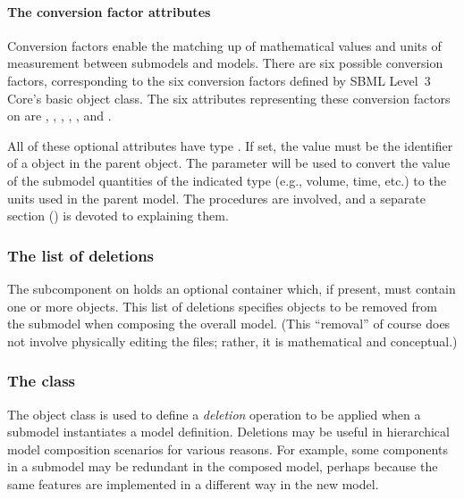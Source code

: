 \paragraph{The conversion factor attributes}
\label{submodel-conversion}

Conversion factors enable the matching up of mathematical values and
units of measurement between submodels and models.  There are six
possible conversion factors, corresponding to the six conversion factors
defined by SBML Level~3 Core's basic \Model object class.  The six
attributes representing these conversion factors on \Submodel are
, ,
, ,
, and .

All of these optional attributes have type .  If set,
the value must be the identifier of a \Parameter object in the parent
\Model object.  The parameter will be used to convert the value of the
submodel quantities of the indicated type (e.g., volume, time, etc.) to
the units used in the parent model.  The procedures are involved, and a
separate section () is devoted to explaining
them.


\subsubsection{The list of deletions}
\label{listofdeletions}

The  subcomponent on \Submodel holds an optional
\ListOfDeletions container which, if present, must contain one or more
\Deletion objects.  This list of deletions specifies objects to be
removed from the submodel when composing the overall model.  (This
``removal'' of course does not involve physically editing the files;
rather, it is mathematical and conceptual.)


\subsubsection{The  class}
\label{deletion-class}

The \Deletion object class is used to define a \emph{deletion} operation
to be applied when a submodel instantiates a model definition.
Deletions may be useful in hierarchical model composition scenarios for
various reasons.  For example, some components in a submodel may be
redundant in the composed model, perhaps because the same features are
implemented in a different way in the new model.

